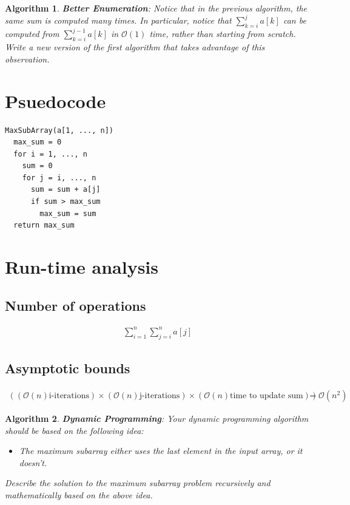 \documentclass{article}
\newtheorem{algorithm}{Algorithm}
\begin{document}
\begin{algorithm}
\textbf{Better Enumeration}: Notice that in the previous algorithm,  the
same sum is computed many times.  In particular, notice that
$\sum_{k=i}^{j}a[k]$ can be computed from $\sum_{k=i}^{j-1}a[k]$ in
$\mathcal{O}(1)$ time, rather than starting from scratch. Write a new version
of the first algorithm that takes advantage of this observation.
\end{algorithm}

\section*{Psuedocode}

\begin{verbatim}
MaxSubArray(a[1, ..., n])
  max_sum = 0
  for i = 1, ..., n
    sum = 0
    for j = i, ..., n
      sum = sum + a[j]
      if sum > max_sum
        max_sum = sum
  return max_sum
\end{verbatim}

\section*{Run-time analysis}

\subsection*{Number of operations}
\begin{eqnarray*}
  \sum_{i=1}^{n}\sum_{j=i}^{n}a[j]
\end{eqnarray*}

\subsection*{Asymptotic bounds}
\begin{eqnarray*}
    ((\mathcal{O}(n) \text{i-iterations}) \times
    (\mathcal{O}(n) \text{j-iterations}) \times
    (\mathcal{O}(n) \text{time to update sum}) ) = \mathcal{O}(n^2)
\end{eqnarray*}


\begin{algorithm}
\textbf{Dynamic Programming}: Your dynamic programming algorithm should be
based on the following idea:

\begin{itemize}
\item The maximum subarray either uses the last element in the input array,
or it doesn't.
\end{itemize}

Describe the solution to the maximum subarray problem recursively and
mathematically based on the above idea.
\end{algorithm}
\end{document}

